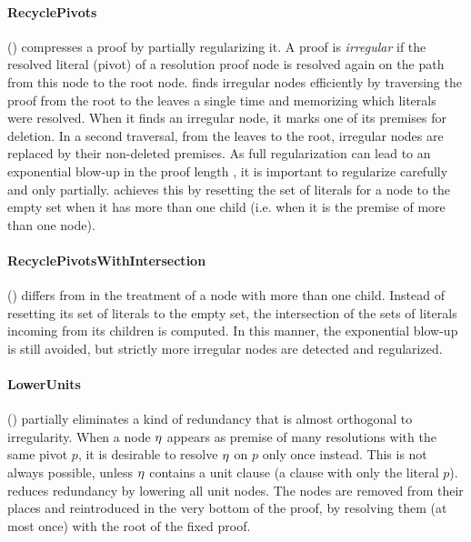 \documentclass{llncs}
\begin{document}
\paragraph{RecyclePivots} () \cite{RP08,RP11} compresses a proof by partially regularizing it. A proof is \emph{irregular} \cite{Tseitin} if the resolved literal (pivot) of a resolution proof node is resolved again on the path from this node to the root node.  finds irregular nodes efficiently by traversing the proof from the root to the leaves a single time and memorizing which literals were resolved. When it finds an irregular node, it marks one of its premises for deletion. In a second traversal, from the leaves to the root, irregular nodes are replaced by their non-deleted premises. As full regularization can lead to an exponential blow-up in the proof length \cite{Goerdt}, it is important to regularize carefully and only partially.  achieves this by resetting the set of literals for a node to the empty set when it has more than one child (i.e. when it is the premise of more than one node).

\pskip

\paragraph{RecyclePivotsWithIntersection} () \cite{LURPI}
differs from  in the treatment of a node with more than one child. Instead of resetting its set of literals to the empty set, the intersection of the sets of literals incoming from its children is computed. In this manner, the exponential blow-up is still avoided, but strictly more irregular nodes are detected and regularized.

\pskip

\paragraph{LowerUnits} () \cite{LURPI} partially eliminates a kind of redundancy that is almost orthogonal to irregularity. When a node $\eta$ appears as premise of many resolutions
with the same pivot $p$, it is desirable to resolve $\eta$ on $p$ only once instead. This is not always possible, unless $\eta$ contains a unit clause (a clause with only the literal $p$).
 reduces redundancy by lowering all unit nodes. The nodes are removed from their places and reintroduced in the very bottom of the proof, by resolving them (at most once) with the root of the fixed proof. 
\end{document}
